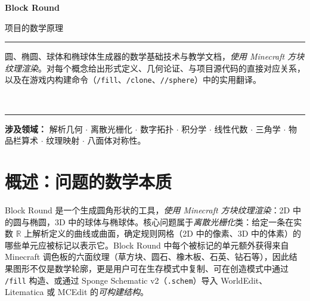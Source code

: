 \documentclass[12pt,a4paper]{scrartcl}
\newcommand{\code}[1]{\texttt{\small #1}}
\newcommand{\cmd}[1]{\textcolor{earth}{\texttt{\small #1}}}
\begin{document}
\begin{titlepage}
  \centering
  \vspace*{3.5cm}
  {\sffamily\bfseries\fontsize{56}{60}\selectfont \color{accent} Block Round\par}
  \vspace{0.7cm}
  {\sffamily\LARGE\color{muted} 项目的数学原理\par}
  \vspace{1.4cm}
  {\color{rule}\rule{0.6\textwidth}{0.6pt}\par}
  \vspace{0.9cm}
  \begin{minipage}{0.82\textwidth}
    \centering\color{ink}\large
    圆、椭圆、球体和椭球体生成器的数学基础技术与教学文档，\emph{使用 Minecraft 方块纹理渲染}。对每个概念给出形式定义、几何论证、与项目源代码的直接对应关系，以及在游戏内构建命令（\cmd{/fill}、\cmd{/clone}、\cmd{//sphere}）中的实用翻译。
  \end{minipage}
  \vspace{0.9cm}\\
  {\color{rule}\rule{0.6\textwidth}{0.6pt}\par}
  \vspace{2cm}
  \begin{minipage}{0.78\textwidth}
    \centering\sffamily\small\color{muted}
    \textbf{涉及领域：} 解析几何 $\cdot$ 离散光栅化 $\cdot$ 数字拓扑 $\cdot$ 积分学 $\cdot$ 线性代数 $\cdot$ 三角学 $\cdot$ 物品栏算术 $\cdot$ 纹理映射 $\cdot$ 八面体对称性。
  \end{minipage}
\end{titlepage}

\renewcommand{\contentsname}{\color{accent}目录}
\tableofcontents
\thispagestyle{fancy}
\newpage

\section{概述：问题的数学本质}

Block Round 是一个生成圆角形状的工具，\emph{使用 Minecraft 方块纹理渲染}：2D 中的圆与椭圆，3D 中的球体与椭球体。核心问题属于\emph{离散光栅化}类：给定一条在实数 $\mathbb{R}$ 上解析定义的曲线或曲面，确定规则网格（2D 中的像素、3D 中的体素）的哪些单元应被标记以表示它。Block Round 中每个被标记的单元额外获得来自 Minecraft 调色板的六面纹理（草方块、圆石、橡木板、石英、钻石等），因此结果图形不仅是数学轮廓，更是用户可在生存模式中复制、可在创造模式中通过 \cmd{/fill} 构造、或通过 Sponge Schematic v2（\code{.schem}）导入 WorldEdit、Litematica 或 MCEdit 的\emph{可构建结构}。
\end{document}
